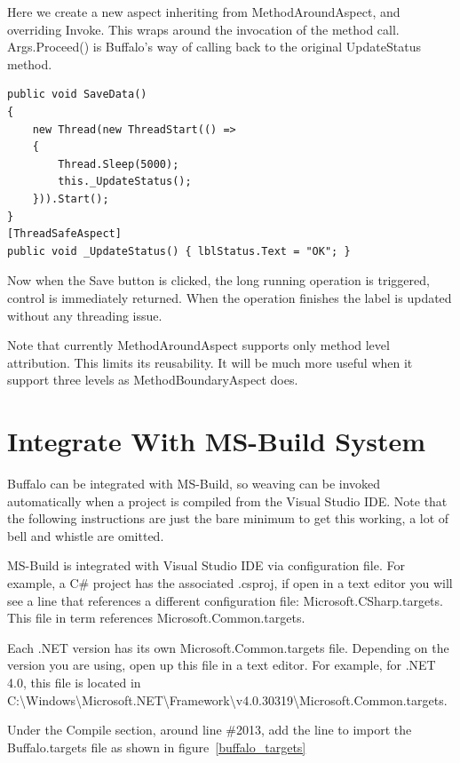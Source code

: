 Here we create a new aspect inheriting from MethodAroundAspect, and overriding Invoke. This wraps around the invocation of the method call. Args.Proceed() is Buffalo’s way of calling back to the original UpdateStatus method.

\begin{lstlisting}[caption={Apply ThreadSafeAspect}, label=savedata5, frame=tb, basicstyle=\scriptsize]
public void SaveData()
{
	new Thread(new ThreadStart(() =>
	{
		Thread.Sleep(5000);
		this._UpdateStatus();
	})).Start();
}
[ThreadSafeAspect]
public void _UpdateStatus() { lblStatus.Text = "OK"; }
\end{lstlisting}

Now when the Save button is clicked, the long running operation is triggered, control is immediately returned. When the operation finishes the label is updated without any threading issue.

Note that currently MethodAroundAspect supports only method level attribution. This limits its reusability. It will be much more useful when it support three levels as MethodBoundaryAspect does.


\section{Integrate With MS-Build System}

Buffalo can be integrated with MS-Build, so weaving can be invoked automatically when a project is compiled from the Visual Studio IDE. Note that the following instructions are just the bare minimum to get this working, a lot of bell and whistle are omitted.

MS-Build is integrated with Visual Studio IDE via configuration file. For example, a C\# project has the associated .csproj, if open in a text editor you will see a line that references a different configuration file: Microsoft.CSharp.targets. This file in term references Microsoft.Common.targets.

Each .NET version has its own Microsoft.Common.targets file. Depending on the version you are using, open up this file in a text editor. For example, for .NET 4.0, this file is located in C:\textbackslash Windows\textbackslash Microsoft.NET\textbackslash Framework\textbackslash v4.0.30319\textbackslash Microsoft.Common.targets.

Under the Compile section, around line \#2013, add the line to import the Buffalo.targets file as shown in figure~\ref{buffalo_targets}

